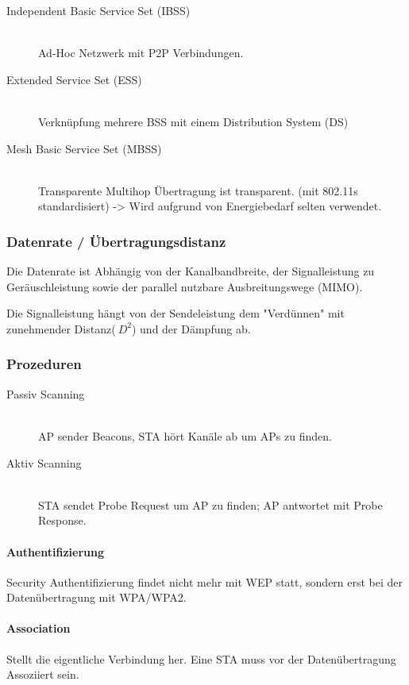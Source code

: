 \begin{multicols}{2}
\begin{description}
		\item[Independent Basic Service Set (IBSS)] \hfill \\
		 Ad-Hoc Netzwerk mit P2P Verbindungen.
		 
		\item[Extended Service Set (ESS)] \hfill \\
		 Verknüpfung mehrere BSS mit einem Distribution System (DS)
		 
		\item[Mesh Basic Service Set (MBSS)] \hfill \\
		 Transparente Multihop Übertragung ist transparent. (mit 802.11s standardisiert) -> Wird aufgrund von Energiebedarf selten verwendet.
		 
	\end{description}
	
	\subsubsection{Datenrate / Übertragungsdistanz}
		Die Datenrate ist Abhängig von der Kanalbandbreite, der Signalleistung zu Geräuschleistung sowie der parallel nutzbare Ausbreitungswege (MIMO).
		
		Die Signalleistung hängt von der Sendeleistung dem "Verdünnen" mit zunehmender Distanz($~D^2$) und der Dämpfung ab.
		
	\subsubsection{Prozeduren}
	
		\begin{description}
			\item[Passiv Scanning] \hfill \\
				AP sender Beacons, STA hört Kanäle ab um APs zu finden.
			
			\item[Aktiv Scanning] \hfill \\
				STA sendet Probe Request um AP zu finden; AP antwortet mit Probe Response.
		\end{description}
		
		\paragraph{Authentifizierung}
			Security Authentifizierung findet nicht mehr mit WEP statt, sondern erst bei der Datenübertragung mit WPA/WPA2.
		
		\paragraph{Association}
			Stellt die eigentliche Verbindung her. Eine STA muss vor der Datenübertragung Assoziiert sein.
			

\end{multicols}
